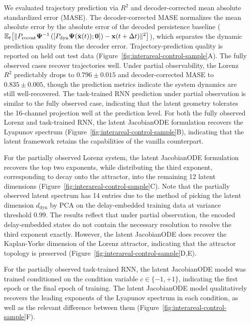 We evaluated trajectory prediction via $R^2$ and decoder-corrected mean absolute standardized error (MASE). The decoder-corrected MASE normalizes the mean absolute error by the absolute error of the decoded persistence baseline ($\mathbb{E}_t\big[\|P_{\text{recent}}\vb{\Psi}^{-1}\left([P_{\text{dyn}}\vb{\Psi}(\tilde{\vb{x}}(t)); \mathbf{0}]\right) - \vb{x}(t + \Delta t)\|^2\big]$), which separates the dynamic prediction quality from the decoder error. Trajectory-prediction quality is reported on held out test data (Figure~\ref{fig:interareal-control-sample}A). The fully observed cases recover trajectories well. Under partial observability, the Lorenz $R^{2}$ predictably drops to $0.796\pm 0.015$ and decoder-corrected MASE to $0.835\pm 0.005$, though the prediction metrics indicate the system dynamics are still well-recovered. The task-trained RNN prediction under partial observation is similar to the fully observed case, indicating that the latent geometry tolerates the 16-channel projection well at the prediction level. For both the fully observed Lorenz and task-trained RNN, the latent JacobianODE formulation recovers the Lyapunov spectrum (Figure~\ref{fig:interareal-control-sample}B), indicating that the latent framework retains the capabilities of the vanilla counterpart.

For the partially observed Lorenz system, the latent JacobianODE formulation recovers the top two exponents, while distributing the third exponent, corresponding to decay onto the attractor, into the remaining 12 latent dimensions (Figure~\ref{fig:interareal-control-sample}C). Note that the partially observed latent spectrum has 14 entries due to the method of picking the latent dimension $d_{\mathrm{dyn}}$ by PCA on the delay-embedded training data at variance threshold $0.99$. The results reflect that under partial observation, the encoded delay-embedded states do not contain the necessary resolution to resolve the third exponent exactly. However, the latent JacobianODE does recover the Kaplan-Yorke dimension of the Lorenz attractor, indicating that the attractor topology is preserved (Figure~\ref{fig:interareal-control-sample}D,E).

For the partially observed task-trained RNN, the latent JacobianODE model was trained conditioned on the condition variable $c \in \{-1, +1\}$, indicating the first epoch or the final epoch of training. The latent JacobianODE model qualitatively recovers the leading exponents of the Lyapunov spectrum in each condition, as well as the relevant difference between them (Figure~\ref{fig:interareal-control-sample}F).

